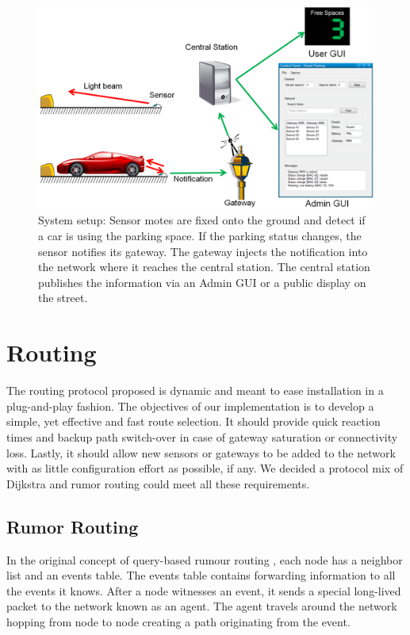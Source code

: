 \begin{figure}
    \centering
    \includegraphics[width=15cm]{images/General_SpaceDetectionAndGUI.png}
	\vspace{-1.5em}
    \caption[System setup and vacant space detection]{System setup: Sensor motes are fixed onto the ground and detect if a car is using the parking space. 
	If the parking status changes, the sensor notifies its gateway. 
	The gateway injects the notification into the network where it reaches the central station. 
	The central station publishes the information via an Admin GUI or a public display on the street.}
    \vspace{-1.5em}
    \label{fig:system_setup}
\end{figure}

\section{Routing}
The routing protocol proposed is dynamic and meant to ease installation in a plug-and-play fashion. 
The objectives of our implementation is to develop a simple, yet effective and fast route selection. 
It should provide quick reaction times and backup path switch-over in case of gateway saturation or connectivity loss.
Lastly, it should allow new sensors or gateways to be added to the network with as little configuration effort as possible, if any.
We decided a protocol mix of Dijkstra and rumor routing could meet all these requirements.

\bigskip
\subsection{Rumor Routing}
In the original concept of query-based rumour routing \cite{rumor_routing_2002}, each node has a neighbor list and an events table. The events table contains forwarding information to all the events it knows. 
After a node witnesses an event, it sends a special long-lived packet to the network known as an agent.
The agent travels around the network hopping from node to node creating a path originating from the event.

